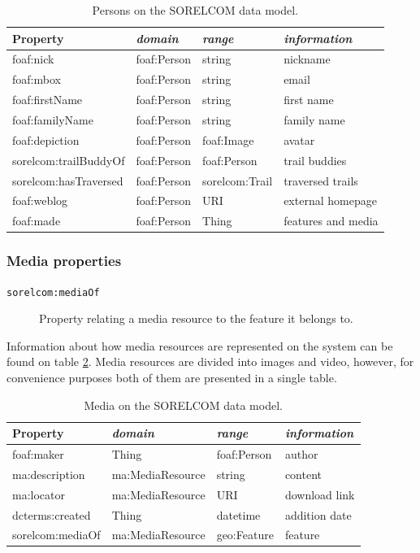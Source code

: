 \begin{table}[ht]
  \centering
  \caption{Persons on the SORELCOM data model.}\label{tab:user}
  \begin{tabular}{llll}
    \toprule
      \textbf{Property} & \emph{domain}  & \emph{range} & \emph{information}\\
    \midrule
      foaf:nick & foaf:Person  & string & nickname \\
      foaf:mbox & foaf:Person  & string & email \\
      foaf:firstName & foaf:Person  & string & first name \\
      foaf:familyName & foaf:Person  & string & family name \\
      foaf:depiction & foaf:Person  & foaf:Image & avatar \\
      sorelcom:trailBuddyOf & foaf:Person  & foaf:Person & trail buddies \\
      sorelcom:hasTraversed & foaf:Person & sorelcom:Trail & traversed trails \\
      foaf:weblog & foaf:Person  & URI & external homepage \\
      foaf:made & foaf:Person  & Thing & features and media \\
    \bottomrule
  \end{tabular}
\end{table}

\subsubsection*{Media properties}

\begin{description}
\item[\texttt{sorelcom:mediaOf}] Property relating a media resource to the feature it belongs to.
\end{description}

Information about how media resources are represented on the system can be found on table \ref{tab:media}. Media resources are divided into images and video, however, for convenience purposes both of them are presented in a single table. 

\begin{table}[ht]
  \centering
  \caption{Media on the SORELCOM data model.}\label{tab:media}
  \begin{tabular}{llll}
    \toprule
      \textbf{Property} & \emph{domain}  & \emph{range} & \emph{information}\\
    \midrule
      foaf:maker & Thing & foaf:Person & author \\
      ma:description & ma:MediaResource & string & content \\
      ma:locator & ma:MediaResource & URI & download link \\
      dcterms:created & Thing & datetime & addition date \\
      sorelcom:mediaOf & ma:MediaResource & geo:Feature & feature \\
    \bottomrule
  \end{tabular}
\end{table}

